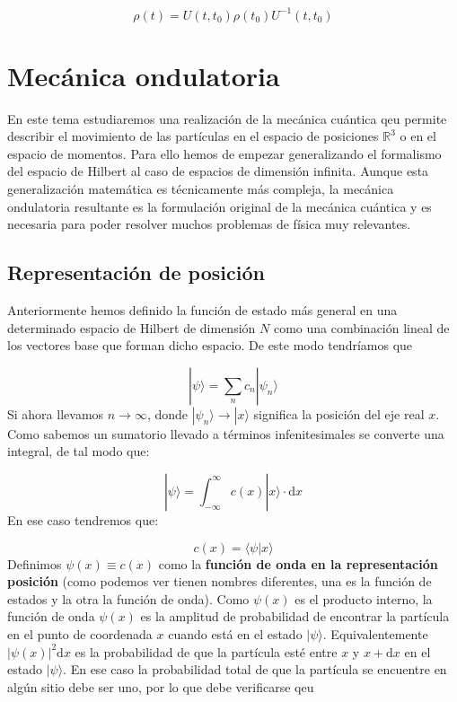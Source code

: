 \documentclass[12pt]{book}
\numberwithin{equation}{chapter}
\numberwithin{figure}{chapter}
\newcommand{\D}{\mathrm{d}}
\newcommand{\intinf}{\int_{-\infty}^{\infty}}
\begin{document}
\begin{equation}
\rho (t) = U (t,t_0) \rho (t_0) U^{-1} (t,t_0)
\end{equation}

\chapter{Mecánica ondulatoria}

En este tema estudiaremos una realización de la mecánica cuántica qeu permite describir el movimiento de las partículas en el espacio de posiciones $\mathbb{R}^3$ o en el espacio de momentos. Para ello hemos de empezar generalizando el formalismo del espacio de Hilbert al caso de espacios de dimensión infinita. Aunque esta generalización matemática es técnicamente más compleja, la mecánica ondulatoria resultante es la formulación original de la mecánica cuántica y es necesaria para poder resolver muchos problemas de física muy relevantes. 


\section{Representación de posición}

Anteriormente hemos definido la función de estado más general en una determinado espacio de Hilbert de dimensión $N$ como una combinación lineal de los vectores base que forman dicho espacio. De este modo tendríamos que

\begin{equation}
|\psi \rangle = \sum_n c_n |\psi_n\rangle
\end{equation}
Si ahora llevamos $n \rightarrow \infty$, donde $|\psi_n \rangle \rightarrow |x\rangle$ significa la posición del eje real $x$. Como sabemos un sumatorio llevado a términos infenitesimales se converte una integral, de tal modo que:

\begin{equation}
|\psi \rangle = \intinf c(x) |x\rangle  \cdot \D x 
\end{equation}
En ese caso tendremos que:

\begin{equation}
c (x) = \langle \psi | x \rangle
\end{equation}
Definimos $\psi (x) \equiv c (x)$ como la \textbf{función de onda en la representación posición} (como podemos ver tienen nombres diferentes, una es la función de estados y la otra la función de onda). Como $\psi(x)$ es el producto interno, la función de onda $\psi (x)$ es la amplitud de probabilidad de encontrar la partícula en el punto de coordenada $x$ cuando está en el estado $|\psi\rangle$. Equivalentemente $|\psi(x)|^2 \D x$ es la probabilidad de que la partícula esté entre $x$ y $x+\D x$ en el estado $|\psi\rangle$. En ese caso la probabilidad total de que la partícula se encuentre en algún sitio debe ser uno, por lo que debe verificarse qeu
\end{document}
